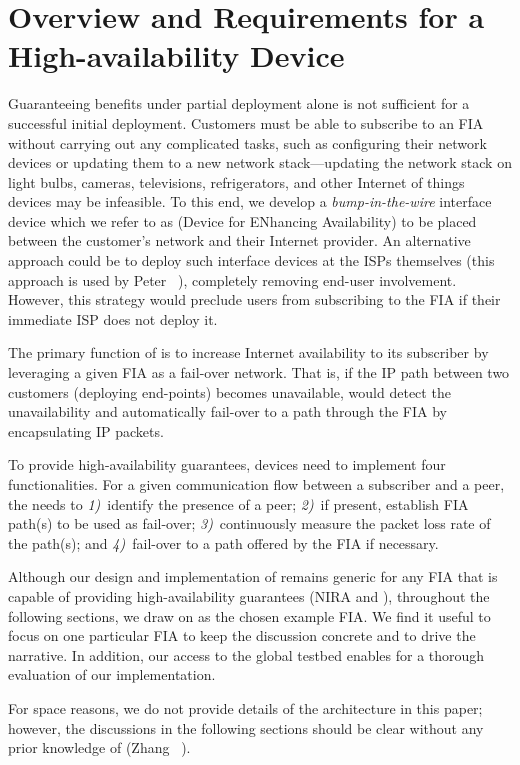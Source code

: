 \section{Overview and Requirements for a High-availability Device}
\label{sec:overview}
Guaranteeing benefits under partial deployment alone is not sufficient for a
successful initial deployment. Customers must be able to subscribe to an FIA
without carrying out any complicated tasks, such as configuring their network
devices or updating them to a new network stack---updating the network stack on
light bulbs, cameras, televisions, refrigerators, and other Internet of things
devices may be infeasible. To this end, we develop a \textit{bump-in-the-wire}
interface device which we refer to as \name (Device for ENhancing Availability)
to be placed between the customer's network and their Internet provider. An
alternative approach could be to deploy such interface devices at the ISPs
themselves (this approach is used by Peter
\etal~\cite{DBLP:conf/sigcomm/PeterJZWAK14}), completely removing end-user
involvement. However, this strategy would preclude users from subscribing to
the FIA if their immediate ISP does not deploy it.

The primary function of \name is to increase Internet availability to its
subscriber by leveraging a given FIA as a fail-over network. That is, if the IP
path between two customers (deploying end-points) becomes unavailable, \name
would detect the unavailability and automatically fail-over to a path through
the FIA by encapsulating IP packets.

To provide high-availability guarantees, \name devices need to implement four
functionalities. For a given communication flow between a subscriber and a
peer, the \name needs to \textit{1)}~identify the presence of a peer;
\textit{2)}~if present, establish FIA path(s) to be used as fail-over;
\textit{3)}~continuously measure the packet loss rate of the path(s); and
\textit{4)}~fail-over to a path offered by the FIA if necessary. 

Although our design and implementation of \name remains generic for any FIA
that is capable of providing high-availability guarantees (\eg NIRA and
\scion), throughout the following sections, we draw on \scion as the chosen
example FIA. We find it useful to focus on one particular FIA to keep the
discussion concrete and to drive the narrative. In addition, our access to the
global \scion testbed enables for a thorough evaluation of our implementation.

For space reasons, we do not provide details of the \scion architecture in this
paper; however, the discussions in the following sections should be clear
without any prior knowledge of \scion (Zhang \etal~\cite{scion2011}). 

